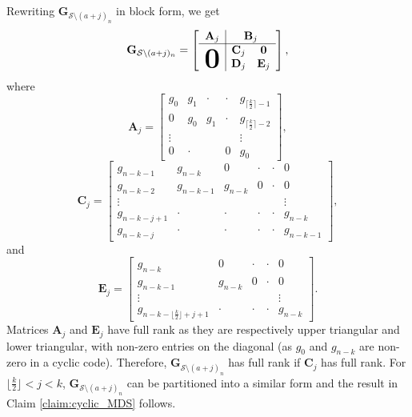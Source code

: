 \documentclass[journal,twocolumn]{IEEEtran}
\theoremstyle{definition}
\newcommand{\calS}{\mathcal{S}}
\newcommand{\bfG}{\mathbf{G}}
\begin{document}
Rewriting $\bfG_{\calS\setminus (a+j)_n}$ in block form, we get
\begin{align*}
\bfG_{\calS\setminus (a+j)_n}=
\left[
\begin{array}{c|cc}
\mathbf A_j&\multicolumn{2}{c}{\mathbf B_j}\\  \hline
\multirow{2}*{\Huge$\mathbf 0$}&\mathbf C_j&\mathbf 0\\
&\mathbf D_j&\mathbf E_j
\end{array}
\right],
\end{align*}
where
$$\mathbf A_j=\begin{bmatrix}
g_0&g_1&\cdot&\cdot&g_{\lceil\frac{k}{2}\rceil-1}\\
0&g_0&g_1&\cdot&g_{\lceil\frac{k}{2}\rceil-2}\\
\vdots&&&&\vdots\\
0&\cdot&&0&g_0
\end{bmatrix},$$
$$\mathbf C_j=\begin{bmatrix}
g_{n-k-1}&g_{n-k}&0&\cdot&\cdot&0\\
g_{n-k-2}&g_{n-k-1}&g_{n-k}&0&\cdot&0\\
\vdots&&&&&\vdots\\
g_{n-k-j+1}&\cdot&\cdot&\cdot&\cdot&g_{n-k}\\
g_{n-k-j}&\cdot&\cdot&\cdot&\cdot&g_{n-k-1}
\end{bmatrix},$$
and
$$\mathbf E_j=\begin{bmatrix}
g_{n-k}&0&\cdot&\cdot&0\\
g_{n-k-1}&g_{n-k}&0&\cdot&0\\
\vdots&&&&\vdots\\
g_{n-k-\lfloor \frac{k}{2}\rfloor+j+1}&\cdot&\cdot&\cdot&g_{n-k}
\end{bmatrix}.$$
Matrices $\mathbf A_j$ and $\mathbf E_j$ have full rank as they are respectively upper triangular and lower triangular, with non-zero entries on the diagonal (as $g_0$ and $g_{n-k}$ are non-zero in a cyclic code). Therefore, $\bfG_{\calS\setminus (a+j)_n}$ has full rank if $\mathbf C_j$ has full rank.
For $\lfloor \frac{k}{2}\rfloor<j<k$, $\bfG_{\calS\setminus (a+j)_n}$ can be partitioned into a similar form and the result in Claim \ref{claim:cyclic_MDS} follows.
\endproof
\end{document}
